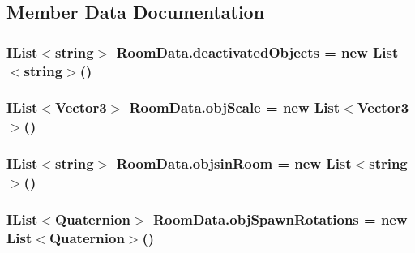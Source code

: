 \subsection{Member Data Documentation}
\subsubsection[{\texorpdfstring{deactivated\+Objects}{deactivatedObjects}}]{\setlength{\rightskip}{0pt plus 5cm}I\+List$<$string$>$ Room\+Data.\+deactivated\+Objects = new List$<$string$>$()}\hypertarget{class_room_data_a227a8598353e3f63cf17330a93f1a903}{}\label{class_room_data_a227a8598353e3f63cf17330a93f1a903}
\subsubsection[{\texorpdfstring{obj\+Scale}{objScale}}]{\setlength{\rightskip}{0pt plus 5cm}I\+List$<$Vector3$>$ Room\+Data.\+obj\+Scale = new List$<$Vector3$>$()}\hypertarget{class_room_data_afe1d84ddbb3cfd44b381369ec7468974}{}\label{class_room_data_afe1d84ddbb3cfd44b381369ec7468974}
\subsubsection[{\texorpdfstring{objsin\+Room}{objsinRoom}}]{\setlength{\rightskip}{0pt plus 5cm}I\+List$<$string$>$ Room\+Data.\+objsin\+Room = new List$<$string$>$()}\hypertarget{class_room_data_a0f0ce75aa6f2bd68cf3e9a45df98594b}{}\label{class_room_data_a0f0ce75aa6f2bd68cf3e9a45df98594b}
\subsubsection[{\texorpdfstring{obj\+Spawn\+Rotations}{objSpawnRotations}}]{\setlength{\rightskip}{0pt plus 5cm}I\+List$<$Quaternion$>$ Room\+Data.\+obj\+Spawn\+Rotations = new List$<$Quaternion$>$()}\hypertarget{class_room_data_adca49d6897f272f699a5cc98d591efbc}{}\label{class_room_data_adca49d6897f272f699a5cc98d591efbc}
